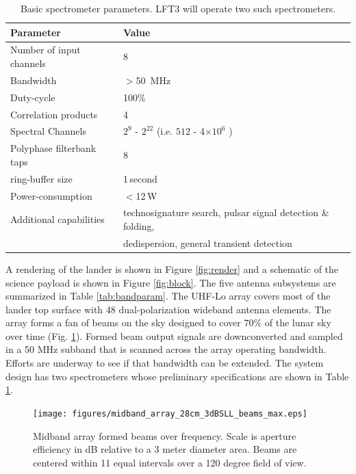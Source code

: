 \begin{table}
\centering
\caption{Basic spectrometer parameters. LFT3 will operate two such spectrometers. \label{tab:spectrometer}}
\begin{tabular}{|l|l|} \hline
\textbf{Parameter} & Value  \\ \hline
Number of input channels & 8 \\ \hline
Bandwidth & $>$50\, MHz \\ \hline
Duty-cycle & 100\% \\ \hline
Correlation products & 4  \\ \hline
Spectral Channels & $2^{9}$ - $2^{22}$  (i.e. $512$ - 4$\times 10^6$ ) \\ \hline
Polyphase filterbank taps & 8 \\ \hline
ring-buffer size & 1\,second \\ \hline
Power-consumption & $<$12\,W \\ \hline
Additional capabilities &  technosignature search, pulsar signal detection \& folding, \\
& dedispersion, general transient detection\\ \hline
\end{tabular}
\end{table}


A rendering of the lander is shown in Figure \ref{fig:render} and a schematic of the science payload is shown in Figure \ref{fig:block}.
The five antenna subsystems are summarized in Table \ref{tab:bandparam}.  The UHF-Lo array covers most of the lander top surface with 48 dual-polarization wideband antenna elements. The array forms a fan of beams on the sky designed to cover 70\% of the lunar sky over time (Fig. \ref{fig:midband_beam_maps}). Formed beam output signals are downconverted and sampled in a 50 MHz subband that is scanned across the array operating bandwidth.  Efforts are underway to see if that bandwidth can be extended. The system design has two spectrometers whose preliminary specifications are shown in Table \ref{tab:spectrometer}. 




\begin{figure}
	\centering
	\texttt{[image: figures/midband\_array\_28cm\_3dBSLL\_beams\_max.eps]}
	\caption{Midband array formed beams over frequency. Scale is aperture efficiency in dB relative to a 3 meter diameter area. Beams are centered within 11 equal intervals over a 120 degree field of view.}
	\label{fig:midband_beam_maps}
\end{figure}

